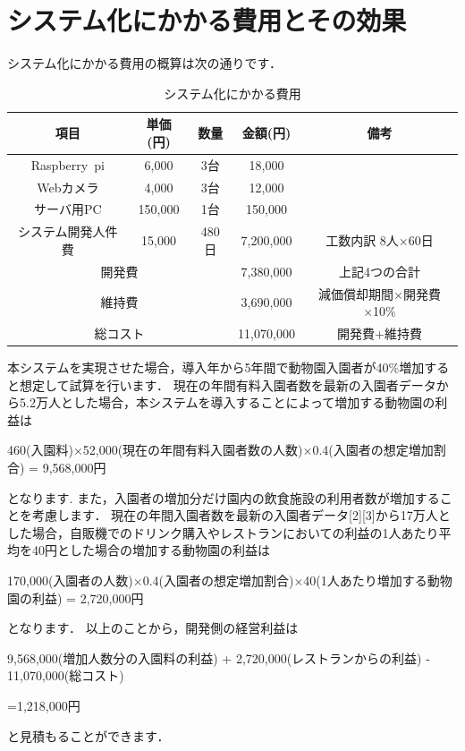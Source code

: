 \documentclass[a4j]{jarticle}
\begin{document}
\section{システム化にかかる費用とその効果}
システム化にかかる費用の概算は次の通りです．
\begin{table}[H]
  \caption{システム化にかかる費用}
  \begin{center}
    \begin{tabular}{|c|c|c|c|c|} \hline
      項目&単価(円)&数量&金額(円)&備考 \\ \hline
      Raspberry~pi&6,000&3台&18,000&　\\ \hline
      Webカメラ&4,000&3台&12,000&　\\ \hline
      サーバ用PC&150,000&1台&150,000&　\\ \hline
      システム開発人件費&15,000&480日&7,200,000&工数内訳 8人×60日 \\ \hline
      \multicolumn{3}{|c|}{開発費}&7,380,000&上記4つの合計 \\ \hline
      \multicolumn{3}{|c|}{維持費}&3,690,000&減価償却期間×開発費×10\% \\ \hline %
      \multicolumn{3}{|c|}{総コスト}&11,070,000&開発費+維持費 \\ \hline
    \end{tabular}
  \end{center}
\end{table}
本システムを実現させた場合，導入年から5年間で動物園入園者が40\%増加すると想定して試算を行います．
現在の年間有料入園者数を最新の入園者データから5.2万人とした場合，本システムを導入することによって増加する動物園の利益は
\begin{screen}
  \begin{center}
    460(入園料)×52,000(現在の年間有料入園者数の人数)×0.4(入園者の想定増加割合) = 9,568,000円
  \end{center}
\end{screen}
となります.
また，入園者の増加分だけ園内の飲食施設の利用者数が増加することを考慮します．
現在の年間入園者数を最新の入園者データ[2][3]から17万人とした場合，自販機でのドリンク購入やレストランにおいての利益の1人あたり平均を40円とした場合の増加する動物園の利益は
\begin{screen}
170,000(入園者の人数)×0.4(入園者の想定増加割合)×40(1人あたり増加する動物園の利益) = 2,720,000円
\end{screen}
となります．
以上のことから，開発側の経営利益は
\begin{screen}
\begin{center}
9,568,000(増加人数分の入園料の利益) + 2,720,000(レストランからの利益) - 11,070,000(総コスト)
\end{center}
\begin{flushright}
=1,218,000円
\end{flushright}
\end{screen}
と見積もることができます．
\end{document}
